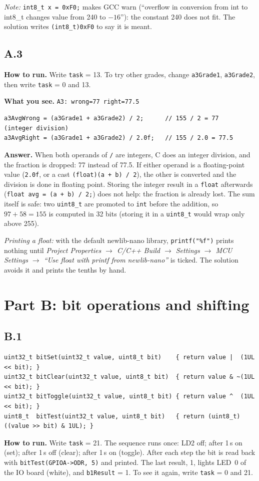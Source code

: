 \documentclass[11pt,a4paper]{article}
\newcommand{\lv}[1]{\texttt{#1}}                 %
\newcommand{\run}[1]{\textbf{How to run.} #1}
\newcommand{\see}[1]{\textbf{What you see.} #1}
\begin{document}
\emph{Note:} \texttt{int8\_t x = 0xF0;} makes GCC warn (``overflow in conversion from int to int8\_t changes value
from 240 to $-16$''): the constant 240 does not fit. The solution writes \texttt{(int8\_t)0xF0} to say it is meant.

\subsection*{A.3}
\run{Write \lv{task} = 13. To try other grades, change \lv{a3Grade1},
\lv{a3Grade2}, then write \lv{task} = 0 and 13.}

\see{\texttt{A3: wrong=77 right=77.5}}
\begin{lstlisting}
a3AvgWrong = (a3Grade1 + a3Grade2) / 2;      // 155 / 2 = 77   (integer division)
a3AvgRight = (a3Grade1 + a3Grade2) / 2.0f;   // 155 / 2.0 = 77.5
\end{lstlisting}
\textbf{Answer.} When both operands of \texttt{/} are integers, C does an integer division, and the fraction is
dropped: 77 instead of 77.5. If either operand is a floating-point value (\texttt{2.0f}, or a cast
\texttt{(float)(a + b) / 2}), the other is converted and the division is done in floating point. Storing the
integer result in a \texttt{float} afterwards (\texttt{float avg = (a + b) / 2;}) does not help: the fraction is
already lost. The sum itself is safe: two \texttt{uint8\_t} are promoted to \texttt{int} before the addition, so
$97 + 58 = 155$ is computed in 32 bits (storing it in a \texttt{uint8\_t} would wrap only above 255).

\emph{Printing a float:} with the default newlib-nano library, \texttt{printf("\%f")} prints nothing until
\emph{Project Properties $\to$ C/C++ Build $\to$ Settings $\to$ MCU Settings $\to$ ``Use float with printf from
newlib-nano''} is ticked. The solution avoids it and prints the tenths by hand.

\section{Part B: bit operations and shifting}

\subsection*{B.1}
\begin{lstlisting}
uint32_t bitSet(uint32_t value, uint8_t bit)    { return value |  (1UL << bit); }
uint32_t bitClear(uint32_t value, uint8_t bit)  { return value & ~(1UL << bit); }
uint32_t bitToggle(uint32_t value, uint8_t bit) { return value ^  (1UL << bit); }
uint8_t  bitTest(uint32_t value, uint8_t bit)   { return (uint8_t)((value >> bit) & 1UL); }
\end{lstlisting}
\run{Write \lv{task} = 21. The sequence runs once: LD2 off; after 1\,s on (set); after 1\,s off (clear); after 1\,s on
(toggle). After each step the bit is read back with \texttt{bitTest(GPIOA->ODR, 5)} and printed. The last result, 1,
lights LED~0 of the IO board (white), and \lv{b1Result} = 1. To see it again, write \lv{task} = 0 and 21.}
\end{document}
